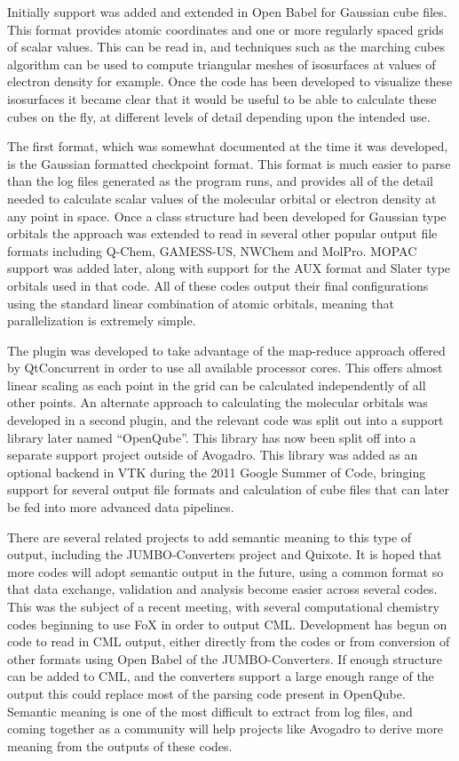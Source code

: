 \documentclass[10pt]{bmc_article}
\newenvironment{bmcformat}{\begin{raggedright}
\baselineskip20pt\sloppy\setboolean{publ}{false}}{\end{raggedright}
\baselineskip20pt\sloppy}
\begin{document}
\begin{bmcformat}
Initially support was added and extended in Open Babel for Gaussian cube files.
This format provides atomic coordinates and one or more regularly spaced grids
of scalar values. This can be read in, and techniques such as the marching cubes
algorithm can be used to compute triangular meshes of isosurfaces at values of
electron density for example. Once the code has been developed to visualize these
isosurfaces it became clear that it would be useful to be able to calculate these cubes
on the fly, at different levels of detail depending upon the intended use.

The first format, which was somewhat documented at the time it was developed, is the
Gaussian formatted checkpoint format. This format is much easier to parse than the
log files generated as the program runs, and provides all of the detail needed to
calculate scalar values of the molecular orbital or electron density at any point in space.
Once a class structure had been developed for Gaussian type orbitals the approach
was extended to read in several other popular output file formats including Q-Chem,
GAMESS-US, NWChem and MolPro. MOPAC support was added later, along with
support for the AUX format and Slater type orbitals used in that code. All of these
codes output their final configurations using the standard linear combination of
atomic orbitals, meaning that parallelization is extremely simple.

The plugin was developed to take advantage of the map-reduce approach offered
by QtConcurrent in order to use all available processor cores. This offers almost
linear scaling as each point in the grid can be calculated independently of all other
points. An alternate approach to calculating the molecular orbitals was developed
in a second plugin, and the relevant code was split out into a support library later
named ``OpenQube''. This library has now been split off into a separate support
project outside of Avogadro. This library was added as an optional backend in
VTK during the 2011 Google Summer of Code, bringing support for several
output file formats and calculation of cube files that can later be fed into more
advanced data pipelines.

There are several related projects to add semantic meaning to this type of output,
including the JUMBO-Converters project and Quixote. It is hoped that more codes
will adopt semantic output in the future, using a common format so that data exchange,
validation and analysis become easier across several codes. This was the subject of
a recent meeting, with several computational chemistry codes beginning to use FoX
in order to output CML. Development has begun on code to read in CML output,
either directly from the codes or from conversion of other formats using Open Babel
of the JUMBO-Converters. If enough structure can be added to CML, and the
converters support a large enough range of the output this could replace most of
the parsing code present in OpenQube. Semantic meaning is one of the most
difficult to extract from log files, and coming together as a community will help
projects like Avogadro to derive more meaning from the outputs of these codes.


\end{bmcformat}
\end{document}
